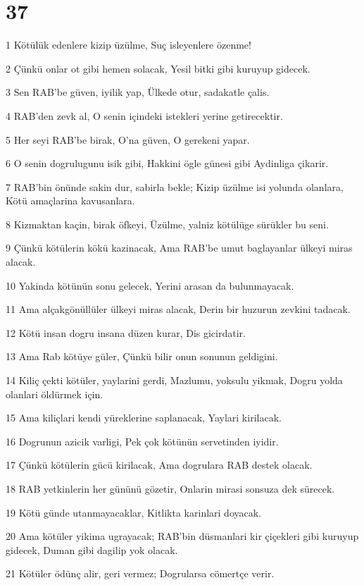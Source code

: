 \chapter{37}

\par 1 Kötülük edenlere kizip üzülme, Suç isleyenlere özenme!
\par 2 Çünkü onlar ot gibi hemen solacak, Yesil bitki gibi kuruyup gidecek.
\par 3 Sen RAB'be güven, iyilik yap, Ülkede otur, sadakatle çalis.
\par 4 RAB'den zevk al, O senin içindeki istekleri yerine getirecektir.
\par 5 Her seyi RAB'be birak, O'na güven, O gerekeni yapar.
\par 6 O senin dogrulugunu isik gibi, Hakkini ögle günesi gibi Aydinliga çikarir.
\par 7 RAB'bin önünde sakin dur, sabirla bekle; Kizip üzülme isi yolunda olanlara, Kötü amaçlarina kavusanlara.
\par 8 Kizmaktan kaçin, birak öfkeyi, Üzülme, yalniz kötülüge sürükler bu seni.
\par 9 Çünkü kötülerin kökü kazinacak, Ama RAB'be umut baglayanlar ülkeyi miras alacak.
\par 10 Yakinda kötünün sonu gelecek, Yerini arasan da bulunmayacak.
\par 11 Ama alçakgönüllüler ülkeyi miras alacak, Derin bir huzurun zevkini tadacak.
\par 12 Kötü insan dogru insana düzen kurar, Dis gicirdatir.
\par 13 Ama Rab kötüye güler, Çünkü bilir onun sonunun geldigini.
\par 14 Kiliç çekti kötüler, yaylarini gerdi, Mazlumu, yoksulu yikmak, Dogru yolda olanlari öldürmek için.
\par 15 Ama kiliçlari kendi yüreklerine saplanacak, Yaylari kirilacak.
\par 16 Dogrunun azicik varligi, Pek çok kötünün servetinden iyidir.
\par 17 Çünkü kötülerin gücü kirilacak, Ama dogrulara RAB destek olacak.
\par 18 RAB yetkinlerin her gününü gözetir, Onlarin mirasi sonsuza dek sürecek.
\par 19 Kötü günde utanmayacaklar, Kitlikta karinlari doyacak.
\par 20 Ama kötüler yikima ugrayacak; RAB'bin düsmanlari kir çiçekleri gibi kuruyup gidecek, Duman gibi dagilip yok olacak.
\par 21 Kötüler ödünç alir, geri vermez; Dogrularsa cömertçe verir.
